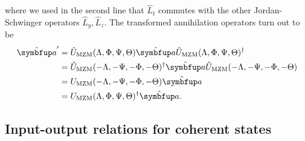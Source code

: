 where we used in the second line that $\hat{L}_t$ commutes with the other Jordan-Schwinger operators $\hat{L}_y,\hat{L}_z$.
The transformed annihilation operators turn out to be
\begin{equation}
	\begin{split}
		\hat{\vb{a}}^\prime
		&=
		\hat{U}_\text{MZM}(\Lambda,\Phi,\Psi,\Theta)
		\hat{\vb{a}}
		\hat{U}_\text{MZM}(\Lambda,\Phi,\Psi,\Theta)^\dagger
		\\
		&=
		\hat{U}_\text{MZM}(-\Lambda,-\Psi,-\Phi,-\Theta)^\dagger
		\hat{\vb{a}}
		\hat{U}_\text{MZM}(-\Lambda,-\Psi,-\Phi,-\Theta)
		\\
		&=
		U_\text{MZM}(-\Lambda,-\Psi,-\Phi,-\Theta)
		\hat{\vb{a}}
		\\
		&=
		U_\text{MZM}(\Lambda,\Phi,\Psi,\Theta)^\dagger
		\hat{\vb{a}}
		.
	\end{split}
\end{equation}

\subsection{Input-output relations for coherent states}

